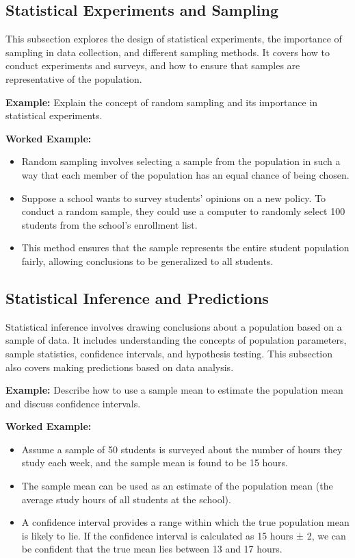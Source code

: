 \documentclass{book}
\begin{document}
\subsection{Statistical Experiments and Sampling}
This subsection explores the design of statistical experiments, the importance of sampling in data collection, and different sampling methods. It covers how to conduct experiments and surveys, and how to ensure that samples are representative of the population.


\textbf{Example:} Explain the concept of random sampling and its importance in statistical experiments.


\textbf{Worked Example:}
\begin{itemize}
        \item Random sampling involves selecting a sample from the population in such a way that each member of the population has an equal chance of being chosen.
        \item Suppose a school wants to survey students' opinions on a new policy. To conduct a random sample, they could use a computer to randomly select 100 students from the school's enrollment list.
        \item This method ensures that the sample represents the entire student population fairly, allowing conclusions to be generalized to all students.
\end{itemize}


\subsection{Statistical Inference and Predictions}
Statistical inference involves drawing conclusions about a population based on a sample of data. It includes understanding the concepts of population parameters, sample statistics, confidence intervals, and hypothesis testing. This subsection also covers making predictions based on data analysis.


\textbf{Example:} Describe how to use a sample mean to estimate the population mean and discuss confidence intervals.


\textbf{Worked Example:}
\begin{itemize}
        \item Assume a sample of 50 students is surveyed about the number of hours they study each week, and the sample mean is found to be 15 hours.
        \item The sample mean can be used as an estimate of the population mean (the average study hours of all students at the school).
        \item A confidence interval provides a range within which the true population mean is likely to lie. If the confidence interval is calculated as 15 hours ± 2, we can be confident that the true mean lies between 13 and 17 hours.
\end{itemize}
\end{document}
